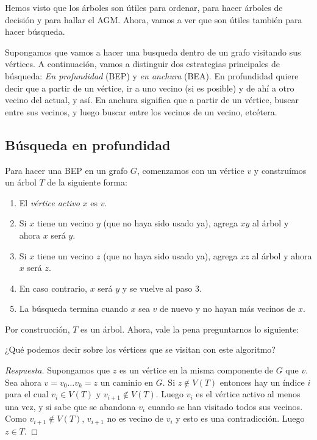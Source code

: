 Hemos visto que los árboles son útiles para ordenar, para hacer árboles de decisión y para hallar el AGM. Ahora, vamos a ver que son útiles también para hacer búsqueda.

Supongamos que vamos a hacer una busqueda dentro de un grafo visitando sus vértices. A continuación, vamos a distinguir dos estrategias principales de búsqueda: \textit{En profundidad} (BEP) y \textit{en anchura} (BEA). En profundidad quiere decir que a partir de un vértice, ir a uno vecino (si es posible) y de ahí a otro vecino del actual, y así. En anchura significa que a partir de un vértice, buscar entre sus vecinos, y luego buscar entre los vecinos de un vecino, etcétera.


\subsection{Búsqueda en profundidad}

Para hacer una BEP en un grafo $G$, comenzamos con un vértice $v$ y construímos un árbol $T$ de la siguiente forma:

\begin{enumerate}
    \item El \textit{vértice activo} $x$ es $v$.
    \item Si $x$ tiene un vecino $y$ (que no haya sido usado ya), agrega $xy$ al árbol y ahora $x$ será $y$.
    \item Si $x$ tiene un vecino $z$ (que no haya sido usado ya), agrega $xz$ al árbol y ahora $x$ será $z$.
    \item En caso contrario, $x$ será $y$ y se vuelve al paso 3.
    \item La búsqueda termina cuando $x$ sea $v$ de nuevo y no hayan más vecinos de $x$.
\end{enumerate}

Por construcción, $T$ es un árbol. Ahora, vale la pena preguntarnos lo siguiente:

\begin{pre}
    ¿Qué podemos decir sobre los vértices que se visitan con este algoritmo?
\end{pre}

\begin{proof}[Respuesta]
    Supongamos que $z$ es un vértice en la misma componente de $G$ que $v$. Sea ahora $v = v_0 \dots v_k = z$ un caminio en $G$. Si $z \notin V(T)$ entonces hay un índice $i$ para el cual $v_i \in V(T)$ y $v_{i+1} \notin V(T)$. Luego $v_i$ es el vértice activo al menos una vez, y si sabe que se abandona $v_i$ cuando se han visitado todos sus vecinos. Como $v_{i+1} \notin V(T)$, $v_{i+1}$ no es vecino de $v_i$ y esto es una contradicción. Luego $z \in T$.
\end{proof}

